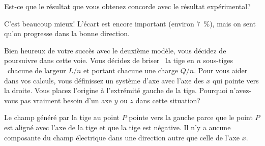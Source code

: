 Est-ce que le résultat que vous obtenez concorde avec le résultat expérimental?

\begin{reponsebox}
  C'est beaucoup mieux! L'écart est encore important (environ
  \SI{7}{\percent}), mais on sent qu'on progresse dans la bonne direction.
\end{reponsebox}




Bien heureux de votre succès avec le deuxième modèle, vous décidez de
poursuivre dans cette voie. Vous décidez de \og briser \fg\ la tige en $n$
\og sous-tiges \fg\ chacune de largeur $L/n$ et portant chacune une charge
$Q/n$.
Pour vous aider dans vos calculs, vous définissez un système d'axe avec l'axe
des $x$ qui pointe vers la droite. Vous placez l'origine à l'extrémité gauche
de la tige. Pourquoi n'avez-vous pas vraiment besoin d'un axe $y$ ou $z$ dans
cette situation?

\begin{reponsebox}
  Le champ généré par la tige au point $P$ pointe vers la gauche parce que le
  point $P$ est aligné avec l'axe de la tige et que la tige est négative. Il
  n'y a aucune composante du champ électrique dans une direction autre que
  celle de l'axe $x$.
\end{reponsebox}


